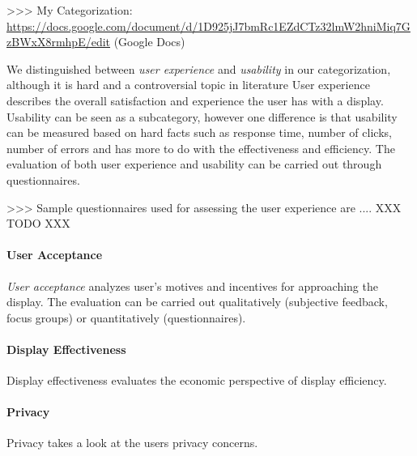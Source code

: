 
	\label{table:standardized-questionnaires}

	


	>>> My Categorization: \url{https://docs.google.com/document/d/1D925jJ7bmRc1EZdCTz32lmW2hniMiq7GzBWxX8rmhpE/edit} (Google Docs)








		We distinguished between \textit{user experience} and \textit{usability} in our categorization, although it is hard and a controversial topic in literature \cite{bevan2009difference}
		User experience describes the overall satisfaction and experience the user has with a display. Usability can be seen as a subcategory, however one difference is that usability can be measured based on hard facts such as response time, number of clicks, number of errors and has more to do with the effectiveness and efficiency. The evaluation of both user experience and usability can be carried out through questionnaires.

			>>> Sample questionnaires used for assessing the user 	experience are .... XXX TODO XXX


	\paragraph{User Acceptance}
		\textit{User acceptance} analyzes user's motives and incentives for approaching the display. The evaluation can be carried out qualitatively (subjective feedback, focus groups) or quantitatively (questionnaires).


	\paragraph{Display Effectiveness}
		Display effectiveness evaluates the economic perspective of display efficiency. 

	\paragraph{Privacy}
		Privacy takes a look at the users privacy concerns.


